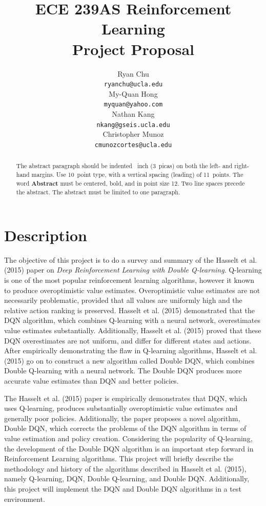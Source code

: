 \documentclass{article}
\title{ECE 239AS Reinforcement Learning\\
       Project Proposal}
\author{%
    Ryan Chu \\
    \texttt{ryanchu@ucla.edu}\\ %
    \And
    My-Quan Hong \\
    \texttt{myquan@yahoo.com} \\
    \And
    Nathan Kang \\
    \texttt{nkang@gseis.ucla.edu} \\
    \And
    Christopher Munoz \\
    \texttt{cmunozcortes@ucla.edu} \\
}
\begin{document}
\maketitle

\begin{abstract}
  The abstract paragraph should be indented ~inch (3~picas) on
  both the left- and right-hand margins. Use 10~point type, with a vertical
  spacing (leading) of 11~points.  The word \textbf{Abstract} must be centered,
  bold, and in point size 12. Two line spaces precede the abstract. The abstract
  must be limited to one paragraph.
\end{abstract}

\section{Description}


The objective of this project is to do a survey and summary of the Hasselt et
al. (2015) paper on \textit{Deep Reinforcement Learning with Double Q-learning}.
Q-learning is one of the most popular reinforcement learning algorithms, however
it known to produce overoptimistic value estimates. Overoptimistic value
estimates are not necessarily problematic, provided that all values are
uniformly high and the relative action ranking is preserved. Hasselt et al.
(2015) demonstrated that the DQN algorithm, which combines Q-learning with a
neural network, overestimates value estimates substantially. Additionally,
Hasselt et al. (2015) proved that these DQN overestimates are not uniform, and
differ for different states and actions. After empirically demonstrating the
flaw in Q-learning algorithms, Hasselt et al. (2015) go on to construct a new
algorithm called Double DQN, which combines Double Q-learning with a neural
network. The Double DQN produces more accurate value estimates than DQN and
better policies.

The Hasselt et al. (2015) paper is empirically demonstrates that  DQN, which
uses Q-learning, produces substantially overoptimistic value estimates and
generally poor policies.  Additionally, the paper proposes a novel algorithm,
Double DQN, which corrects the problems of the DQN algorithm in terms of value
estimation and policy creation. Considering the popularity of Q-learning, the
development of the Double DQN algorithm is an important step forward in
Reinforcement Learning algorithms. This project will briefly describe the
methodology and history of the algorithms described in Hasselt et al. (2015),
namely Q-learning, DQN, Double Q-learning, and Double DQN.  Additionally, this
project will implement the DQN and Double DQN algorithms in a test environment.
\end{document}
